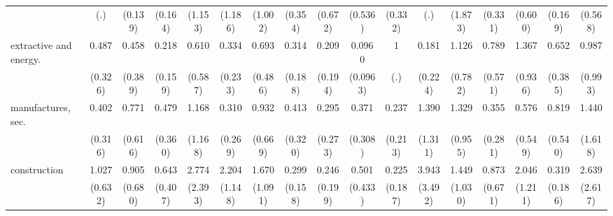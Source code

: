 {\begin{tabular}{l*{16}{c}}
                    &         (.)         &     (0.139)         &     (0.164)         &     (1.153)         &     (1.186)         &     (1.002)         &     (0.354)         &     (0.672)         &     (0.536)         &     (0.332)         &         (.)         &     (1.873)         &     (0.331)         &     (0.600)         &     (0.169)         &     (0.568)         \\
[1em]
extractive and energy.&       0.487         &       0.458         &       0.218\sym{*}  &       0.610         &       0.334         &       0.693         &       0.314         &       0.209         &      0.0960\sym{*}  &           1         &       0.181         &       1.126         &       0.789         &       1.367         &       0.652         &       0.987         \\
                    &     (0.326)         &     (0.389)         &     (0.159)         &     (0.587)         &     (0.233)         &     (0.486)         &     (0.188)         &     (0.194)         &    (0.0963)         &         (.)         &     (0.224)         &     (0.782)         &     (0.571)         &     (0.936)         &     (0.385)         &     (0.993)         \\
[1em]
manufactures, sec.  &       0.402         &       0.771         &       0.479         &       1.168         &       0.310         &       0.932         &       0.413         &       0.295         &       0.371         &       0.237         &       1.390         &       1.329         &       0.355         &       0.576         &       0.819         &       1.440         \\
                    &     (0.316)         &     (0.616)         &     (0.360)         &     (1.168)         &     (0.269)         &     (0.669)         &     (0.320)         &     (0.273)         &     (0.308)         &     (0.213)         &     (1.311)         &     (0.955)         &     (0.281)         &     (0.549)         &     (0.540)         &     (1.618)         \\
[1em]
construction        &       1.027         &       0.905         &       0.643         &       2.774         &       2.204         &       1.670         &       0.299\sym{*}  &       0.246         &       0.501         &       0.225         &       3.943         &       1.449         &       0.873         &       2.046         &       0.319\sym{*}  &       2.639         \\
                    &     (0.632)         &     (0.680)         &     (0.407)         &     (2.393)         &     (1.148)         &     (1.091)         &     (0.158)         &     (0.199)         &     (0.433)         &     (0.187)         &     (3.492)         &     (1.030)         &     (0.671)         &     (1.211)         &     (0.186)         &     (2.617)         \\

\end{tabular}}
